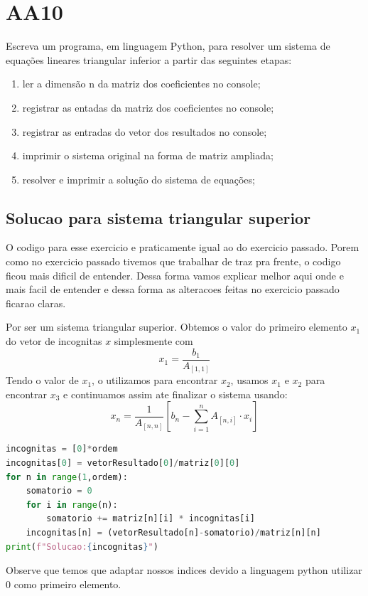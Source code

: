 \documentclass{article}
\begin{document}
\section{AA10}
Escreva um programa, em linguagem Python, para resolver um sistema de equações lineares triangular inferior a partir das seguintes etapas:
\begin{enumerate}
    \item ler a dimensão n da matriz dos coeficientes no console;
    \item registrar as entadas da matriz dos coeficientes no console;
    \item registrar as entradas do vetor dos resultados no console;
    \item imprimir o sistema original na forma de matriz ampliada;
    \item resolver e imprimir a solução do sistema de equações;
\end{enumerate}

\subsection{Solucao para sistema triangular superior}
O codigo para esse exercicio e praticamente igual ao do exercicio passado. Porem como no exercicio passado tivemos que trabalhar de traz pra frente, o codigo ficou mais dificil de entender. Dessa forma vamos explicar melhor aqui onde e mais facil de entender e dessa forma as alteracoes feitas no exercicio passado ficarao claras.

Por ser um sistema triangular superior. Obtemos o valor do primeiro elemento $x_1$ do vetor de incognitas $x$ simplesmente com 
\[
x_1 = \frac{b_1}{A_{[1,1]}}
\]
Tendo o valor de $x_1$, o utilizamos para encontrar $x_2$, usamos $x_1$ e $x_2$ para encontrar $x_3$ e continuamos assim ate finalizar o sistema usando:
\[
x_n =\frac{1}{A_{[n,n]}}[ b_n -\sum_{i=1}^{n} A_{[n,i]} \cdot x_i]
\]
\begin{lstlisting}[language=Python]
incognitas = [0]*ordem
incognitas[0] = vetorResultado[0]/matriz[0][0]
for n in range(1,ordem):
    somatorio = 0
    for i in range(n):
        somatorio += matriz[n][i] * incognitas[i]
    incognitas[n] = (vetorResultado[n]-somatorio)/matriz[n][n]
print(f"Solucao:{incognitas}")
\end{lstlisting}
Observe que temos que adaptar nossos indices devido a linguagem python utilizar 0 como primeiro elemento.
\end{document}
